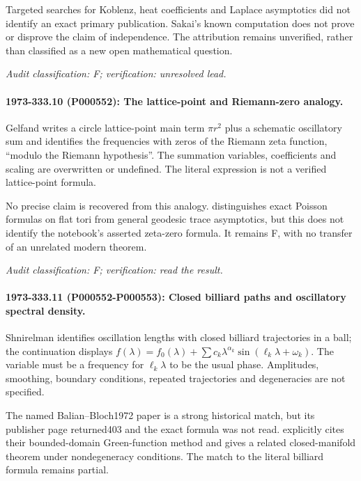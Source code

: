 Targeted searches for Koblenz, heat coefficients and Laplace asymptotics did not identify an exact primary publication. Sakai’s known computation does not prove or disprove the claim of independence. The attribution remains unverified, rather than classified as a new open mathematical question.

\emph{Audit classification: F; verification: unresolved lead.}

\paragraph{1973-333.10 (P000552): The lattice-point and Riemann-zero analogy.}
Gelfand writes a circle lattice-point main term \(\pi r^2\) plus a schematic oscillatory sum and identifies the frequencies with zeros of the Riemann zeta function, “modulo the Riemann hypothesis”. The summation variables, coefficients and scaling are overwritten or undefined. The literal expression is not a verified lattice-point formula.

No precise claim is recovered from this analogy. \citet[introduction]{colindeverdiere1973geodesicsii} distinguishes exact Poisson formulas on flat tori from general geodesic trace asymptotics, but this does not identify the notebook’s asserted zeta-zero formula. It remains F, with no transfer of an unrelated modern theorem.

\emph{Audit classification: F; verification: read the result.}

\paragraph{1973-333.11 (P000552-P000553): Closed billiard paths and oscillatory spectral density.}
Shnirelman identifies oscillation lengths with closed billiard trajectories in a ball; the continuation displays \(f(\lambda)=f_0(\lambda)+\sum c_k\lambda^{\alpha_k}\sin(\ell_k\lambda+\omega_k)\). The variable must be a frequency for \(\ell_k\lambda\) to be the usual phase. Amplitudes, smoothing, boundary conditions, repeated trajectories and degeneracies are not specified.

The named Balian--Bloch1972 paper is a strong historical match, but its publisher page returned403 and the exact formula was not read. \citet[introduction]{colindeverdiere1973geodesicsii} explicitly cites their bounded-domain Green-function method and gives a related closed-manifold theorem under nondegeneracy conditions. The match to the literal billiard formula remains partial.

